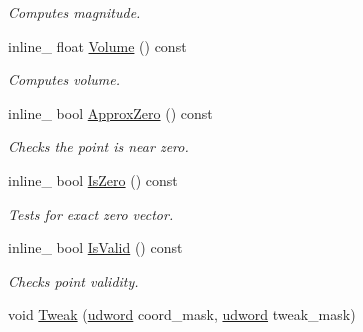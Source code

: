 \begin{DoxyCompactItemize}
\begin{DoxyCompactList}\small\item\em Computes magnitude. \end{DoxyCompactList}\item 
inline\+\_\+ float \hyperlink{classOpcode_1_1Point_a69c0998c073163acad0509b64387108d}{Volume} () const \hypertarget{classOpcode_1_1Point_a69c0998c073163acad0509b64387108d}{}\label{classOpcode_1_1Point_a69c0998c073163acad0509b64387108d}

\begin{DoxyCompactList}\small\item\em Computes volume. \end{DoxyCompactList}\item 
inline\+\_\+ bool \hyperlink{classOpcode_1_1Point_af388c4454be6adf03d4178d7e9256b6b}{Approx\+Zero} () const \hypertarget{classOpcode_1_1Point_af388c4454be6adf03d4178d7e9256b6b}{}\label{classOpcode_1_1Point_af388c4454be6adf03d4178d7e9256b6b}

\begin{DoxyCompactList}\small\item\em Checks the point is near zero. \end{DoxyCompactList}\item 
inline\+\_\+ bool \hyperlink{classOpcode_1_1Point_ac077a957ab57435b27acd188b2a98a62}{Is\+Zero} () const \hypertarget{classOpcode_1_1Point_ac077a957ab57435b27acd188b2a98a62}{}\label{classOpcode_1_1Point_ac077a957ab57435b27acd188b2a98a62}

\begin{DoxyCompactList}\small\item\em Tests for exact zero vector. \end{DoxyCompactList}\item 
inline\+\_\+ bool \hyperlink{classOpcode_1_1Point_addcecaf2eafa2f7fa42c7eb865931594}{Is\+Valid} () const \hypertarget{classOpcode_1_1Point_addcecaf2eafa2f7fa42c7eb865931594}{}\label{classOpcode_1_1Point_addcecaf2eafa2f7fa42c7eb865931594}

\begin{DoxyCompactList}\small\item\em Checks point validity. \end{DoxyCompactList}\item 
void \hyperlink{classOpcode_1_1Point_a8901b9dbf9ff425f19ee23e065ff5287}{Tweak} (\hyperlink{IceTypes_8h_a44c6f1920ba5551225fb534f9d1a1733}{udword} coord\+\_\+mask, \hyperlink{IceTypes_8h_a44c6f1920ba5551225fb534f9d1a1733}{udword} tweak\+\_\+mask)\hypertarget{classOpcode_1_1Point_a8901b9dbf9ff425f19ee23e065ff5287}{}\label{classOpcode_1_1Point_a8901b9dbf9ff425f19ee23e065ff5287}


\end{DoxyCompactItemize}
